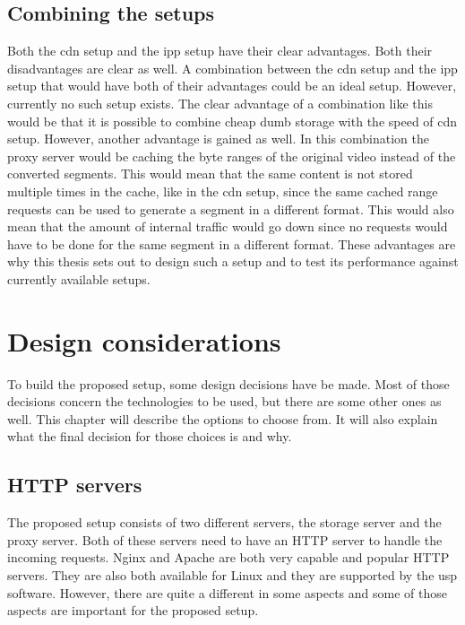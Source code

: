 \documentclass[twoside,openright]{uva-bachelor-thesis}
\begin{document}
\section{Combining the setups}
Both the \gls{cdn} setup and the \gls{ipp} setup have their clear advantages.
Both their disadvantages are clear as well. A combination between the \gls{cdn}
setup and the \gls{ipp} setup that would have both of their advantages could be
an ideal setup. However, currently no such setup exists. The clear advantage
of a combination like this would be that it is possible to combine cheap dumb
storage with the speed of \gls{cdn} setup. However, another advantage is gained
as well. In this combination the proxy server would be caching the byte ranges
of the original video instead of the converted segments. This
would mean that the same content is not stored multiple times in the cache, like
in the \gls{cdn} setup, since the same cached range requests can be used to
generate a segment in a different format. This would also mean that the amount
of internal traffic would go down since no requests would have to be done for
the same segment in a different format. These advantages are why this thesis
sets out to design such a setup and to test its performance against currently
available setups.







\chapter{Design considerations}\label{ch:design}
To build the proposed setup, some design decisions have be made. Most of those
decisions concern the technologies to be used, but there are some other ones as
well. This chapter will describe the options to choose from. It will also
explain what the final decision for those choices is and why.


\section{HTTP servers}
The proposed setup consists of two different servers, the storage server and the
proxy server. Both of these servers need to have an HTTP server to handle the
incoming requests. Nginx and Apache are both very capable and popular HTTP
servers. They are also both available for Linux and they are supported by the
\gls{usp} software. However, there are quite a different in some aspects and some
of those aspects are important for the proposed setup.
\end{document}
